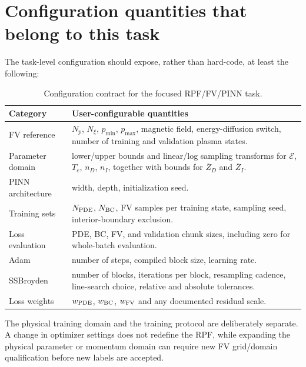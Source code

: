 \documentclass[11pt]{article}
\newcommand{\Ecfg}{\mathcal E}
\begin{document}
\section{Configuration quantities that belong to this task}
\label{sec:config}

The task-level configuration should expose, rather than hard-code, at least the following:

\begin{table}[H]
\centering
\small
\renewcommand{\arraystretch}{1.22}
\begin{tabular}{>{\raggedright\arraybackslash}p{}
                >{\raggedright\arraybackslash}p{}}
\toprule
\textbf{Category} & \textbf{User-configurable quantities}\\
\midrule
FV reference & $N_p$, $N_\xi$, $p_{\min}$, $p_{\max}$, magnetic field, energy-diffusion
switch, number of training and validation plasma states.\\
Parameter domain & lower/upper bounds and linear/log sampling transforms for $\Ecfg$, $T_e$,
$n_D$, $n_I$, together with bounds for $\overline Z_D$ and $\overline Z_I$.\\
PINN architecture & width, depth, initialization seed.\\
Training sets & $N_{\rm PDE}$, $N_{\rm BC}$, FV samples per training state, sampling seed,
interior-boundary exclusion.\\
Loss evaluation & PDE, BC, FV, and validation chunk sizes, including zero for whole-batch
evaluation.\\
Adam & number of steps, compiled block size, learning rate.\\
SSBroyden & number of blocks, iterations per block, resampling cadence, line-search choice,
relative and absolute tolerances.\\
Loss weights & $w_{\rm PDE}$, $w_{\rm BC}$, $w_{\rm FV}$ and any documented residual scale.\\
\bottomrule
\end{tabular}
\caption{Configuration contract for the focused RPF/FV/PINN task.}
\end{table}

The physical training domain and the training protocol are deliberately separate.  A
change in optimizer settings does not redefine the RPF, while expanding the physical
parameter or momentum domain can require new FV grid/domain qualification before new
labels are accepted.
\end{document}
